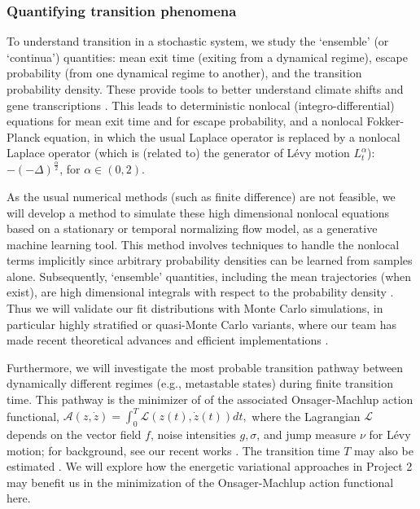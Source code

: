 \documentclass[11pt]{NSFamsart}
\begin{document}
\subsubsection*{Quantifying transition phenomena}
To understand transition   in    a stochastic system, we  study the     `ensemble' (or `continua') quantities: mean exit time (exiting from a dynamical regime),   escape probability (from one dynamical regime to another), and  the transition  probability density. These provide tools to better understand  climate shifts \cite{ZhengYY2020} and  gene transcriptions \cite{ChenWuDuan}. 
This leads to deterministic  nonlocal (integro-differential) equations for mean exit time and for escape probability, and a nonlocal Fokker-Planck equation,
in which the usual Laplace operator is replaced
by a nonlocal Laplace operator (which is (related to) the generator of L\'evy motion $L_t^\alpha$):  $-(-\Delta)^{\frac{\alpha}2  }$, for $\alpha \in (0, 2)$.
 
 
As the usual numerical methods (such as finite difference) are not feasible, we will develop a method to simulate these high dimensional nonlocal equations based on a stationary or temporal normalizing flow model, as a  generative machine learning tool.    This method involves techniques to handle the nonlocal terms implicitly since arbitrary probability densities can be learned from samples alone. Subsequently, `ensemble' quantities, including the mean trajectories (when exist), are high dimensional integrals with respect to the probability density \cite{DuanBook2015}.  Thus we will validate our fit distributions with Monte Carlo simulations, in particular highly stratified or quasi-Monte Carlo variants, where our team has made recent theoretical advances \cite{Hic17a, HicEtal17a} and efficient implementations \cite{QMCPy2020a}. 

Furthermore, we will investigate the most probable transition pathway between dynamically different regimes (e.g., metastable states) during finite transition time. This pathway is the minimizer of  
of the associated Onsager-Machlup action functional, $\mathcal{A}(z, \dot z) = \int_0^T \mathcal{L}(z(t), \dot z(t)) dt,$ where the Lagrangian  $\mathcal{L}$ depends on the vector field $f$, noise intensities $g, \sigma$, and  jump measure $\nu$ for L\'evy motion; for background, see   our recent works \cite{ChaoDuanOM,HuangYF}. The   transition time $T$ may also be estimated \cite{HuangYF2020}. We will explore how the energetic variational approaches in Project 2 may benefit us in the minimization of the Onsager-Machlup action functional here. 
\end{document}
